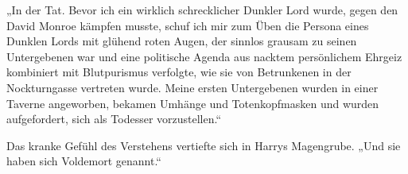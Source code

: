 „In der Tat. Bevor ich ein wirklich schrecklicher Dunkler Lord wurde, gegen den David Monroe kämpfen musste, schuf ich mir zum Üben die Persona eines Dunklen Lords mit glühend roten Augen, der sinnlos grausam zu seinen Untergebenen war und eine politische Agenda aus nacktem persönlichem Ehrgeiz kombiniert mit Blutpurismus verfolgte, wie sie von Betrunkenen in der Nockturngasse vertreten wurde. Meine ersten Untergebenen wurden in einer Taverne angeworben, bekamen Umhänge und Totenkopfmasken und wurden aufgefordert, sich als Todesser vorzustellen.“

Das kranke Gefühl des Verstehens vertiefte sich in Harrys Magengrube.
„Und sie haben sich Voldemort genannt.“

